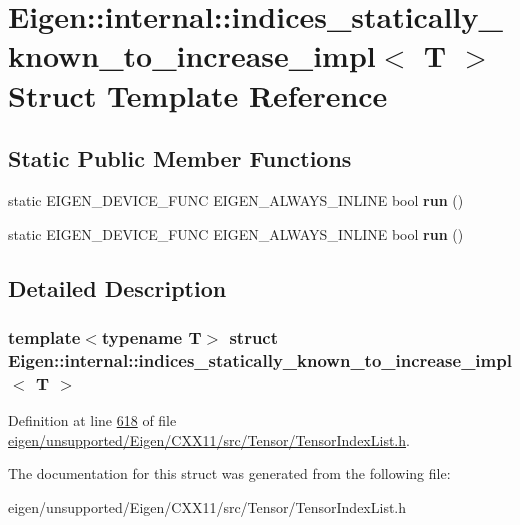 \hypertarget{struct_eigen_1_1internal_1_1indices__statically__known__to__increase__impl}{}\section{Eigen\+:\+:internal\+:\+:indices\+\_\+statically\+\_\+known\+\_\+to\+\_\+increase\+\_\+impl$<$ T $>$ Struct Template Reference}
\label{struct_eigen_1_1internal_1_1indices__statically__known__to__increase__impl}
\subsection*{Static Public Member Functions}
\begin{DoxyCompactItemize}
\item 
\mbox{\label{struct_eigen_1_1internal_1_1indices__statically__known__to__increase__impl_ad27968cefe48e3a34fe1caeaf7426ba9}} 
static E\+I\+G\+E\+N\+\_\+\+D\+E\+V\+I\+C\+E\+\_\+\+F\+U\+NC E\+I\+G\+E\+N\+\_\+\+A\+L\+W\+A\+Y\+S\+\_\+\+I\+N\+L\+I\+NE bool {\bfseries run} ()
\item 
\mbox{\label{struct_eigen_1_1internal_1_1indices__statically__known__to__increase__impl_ad27968cefe48e3a34fe1caeaf7426ba9}} 
static E\+I\+G\+E\+N\+\_\+\+D\+E\+V\+I\+C\+E\+\_\+\+F\+U\+NC E\+I\+G\+E\+N\+\_\+\+A\+L\+W\+A\+Y\+S\+\_\+\+I\+N\+L\+I\+NE bool {\bfseries run} ()
\end{DoxyCompactItemize}


\subsection{Detailed Description}
\subsubsection*{template$<$typename T$>$\newline
struct Eigen\+::internal\+::indices\+\_\+statically\+\_\+known\+\_\+to\+\_\+increase\+\_\+impl$<$ T $>$}



Definition at line \hyperlink{eigen_2unsupported_2_eigen_2_c_x_x11_2src_2_tensor_2_tensor_index_list_8h_source_l00618}{618} of file \hyperlink{eigen_2unsupported_2_eigen_2_c_x_x11_2src_2_tensor_2_tensor_index_list_8h_source}{eigen/unsupported/\+Eigen/\+C\+X\+X11/src/\+Tensor/\+Tensor\+Index\+List.\+h}.



The documentation for this struct was generated from the following file\+:\begin{DoxyCompactItemize}
\item 
eigen/unsupported/\+Eigen/\+C\+X\+X11/src/\+Tensor/\+Tensor\+Index\+List.\+h\end{DoxyCompactItemize}
